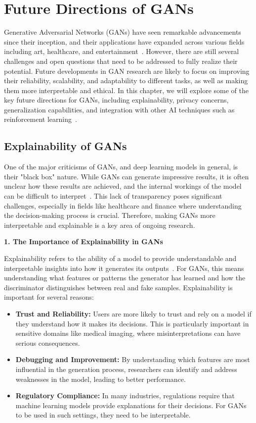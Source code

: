 \chapter{Future Directions of GANs}

Generative Adversarial Networks (GANs) have seen remarkable advancements since their inception, and their applications have expanded across various fields including art, healthcare, and entertainment~\cite{saxena2021generative}. However, there are still several challenges and open questions that need to be addressed to fully realize their potential. Future developments in GAN research are likely to focus on improving their reliability, scalability, and adaptability to different tasks, as well as making them more interpretable and ethical. In this chapter, we will explore some of the key future directions for GANs, including explainability, privacy concerns, generalization capabilities, and integration with other AI techniques such as reinforcement learning~\cite{pan2019recent}.

\section{Explainability of GANs}

One of the major criticisms of GANs, and deep learning models in general, is their "black box" nature. While GANs can generate impressive results, it is often unclear how these results are achieved, and the internal workings of the model can be difficult to interpret~\cite{saxena2021generative}. This lack of transparency poses significant challenges, especially in fields like healthcare and finance where understanding the decision-making process is crucial. Therefore, making GANs more interpretable and explainable is a key area of ongoing research.

\textbf{1. The Importance of Explainability in GANs}

Explainability refers to the ability of a model to provide understandable and interpretable insights into how it generates its outputs~\cite{li2024survey}. For GANs, this means understanding what features or patterns the generator has learned and how the discriminator distinguishes between real and fake samples. Explainability is important for several reasons:
\begin{itemize}
    \item \textbf{Trust and Reliability:} Users are more likely to trust and rely on a model if they understand how it makes its decisions. This is particularly important in sensitive domains like medical imaging, where misinterpretations can have serious consequences.
    \item \textbf{Debugging and Improvement:} By understanding which features are most influential in the generation process, researchers can identify and address weaknesses in the model, leading to better performance.
    \item \textbf{Regulatory Compliance:} In many industries, regulations require that machine learning models provide explanations for their decisions. For GANs to be used in such settings, they need to be interpretable.
\end{itemize}

